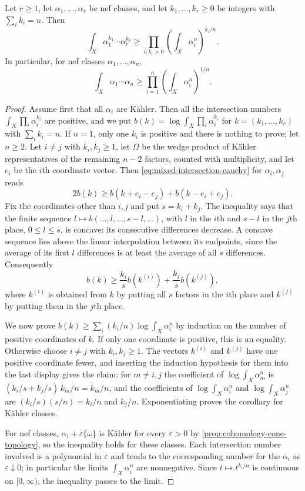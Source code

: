 \begin{corollary}\label{cor:nef-mixed-intersection-geometric-mean}
Let $r\geq1$, let $\alpha_1,\ldots,\alpha_r$ be nef classes, and let $k_1,\ldots,k_r\geq0$ be integers with $\sum_i k_i=n$. Then
\[
 \int_X\alpha_1^{k_1}\cdots\alpha_r^{k_r}
             \geq\prod_{i:k_i>0}\left(\int_X\alpha_i^n\right)^{k_i/n}.
\]
In particular, for nef classes $\alpha_1,\ldots,\alpha_n$,
\[
 \int_X\alpha_1\cdots\alpha_n
             \geq\prod_{i=1}^n\left(\int_X\alpha_i^n\right)^{1/n}.
\]
\end{corollary}
\begin{proof}
Assume first that all $\alpha_i$ are K\"ahler. Then all the intersection numbers $\int_X\prod_i\alpha_i^{k_i}$ are positive, and we put $b(k)=\log\int_X\prod_i\alpha_i^{k_i}$ for $k=(k_1,\ldots,k_r)$ with $\sum_ik_i=n$. If $n=1$, only one $k_i$ is positive and there is nothing to prove; let $n\geq2$. Let $i\neq j$ with $k_i,k_j\geq1$, let $\Omega$ be the wedge product of K\"ahler representatives of the remaining $n-2$ factors, counted with multiplicity, and let $e_i$ be the $i$th coordinate vector. Then \eqref{eq:mixed-intersection-cauchy} for $\alpha_i,\alpha_j$ reads
\[
 2b(k)\geq b(k+e_i-e_j)+b(k-e_i+e_j).
\]
Fix the coordinates other than $i,j$ and put $s=k_i+k_j$. The inequality says that the finite sequence $l\mapsto b(\ldots,l,\ldots,s-l,\ldots)$, with $l$ in the $i$th and $s-l$ in the $j$th place, $0\leq l\leq s$, is concave: its consecutive differences decrease. A concave sequence lies above the linear interpolation between its endpoints, since the average of its first $l$ differences is at least the average of all $s$ differences. Consequently
\[
 b(k)\geq\frac{k_i}{s}b(k^{(i)})+\frac{k_j}{s}b(k^{(j)}),
\]
where $k^{(i)}$ is obtained from $k$ by putting all $s$ factors in the $i$th place and $k^{(j)}$ by putting them in the $j$th place.

We now prove $b(k)\geq\sum_i(k_i/n)\log\int_X\alpha_i^n$ by induction on the number of positive coordinates of $k$. If only one coordinate is positive, this is an equality. Otherwise choose $i\ne j$ with $k_i,k_j\geq1$. The vectors $k^{(i)}$ and $k^{(j)}$ have one positive coordinate fewer, and inserting the induction hypothesis for them into the last display gives the claim: for $m\ne i,j$ the coefficient of $\log\int_X\alpha_m^n$ is $(k_i/s+k_j/s)\,k_m/n=k_m/n$, and the coefficients of $\log\int_X\alpha_i^n$ and $\log\int_X\alpha_j^n$ are $(k_i/s)(s/n)=k_i/n$ and $k_j/n$. Exponentiating proves the corollary for K\"ahler classes.

For nef classes, $\alpha_i+\varepsilon\{\omega\}$ is K\"ahler for every $\varepsilon>0$ by \cref{prop:cohomology-cone-topology}, so the inequality holds for these classes. Each intersection number involved is a polynomial in $\varepsilon$ and tends to the corresponding number for the $\alpha_i$ as $\varepsilon\downarrow0$; in particular the limits $\int_X\alpha_i^n$ are nonnegative. Since $t\mapsto t^{k_i/n}$ is continuous on $[0,\infty)$, the inequality passes to the limit.
\end{proof}

